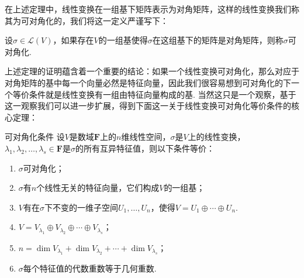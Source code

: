 在上述定理中，线性变换在一组基下矩阵表示为对角矩阵，这样的线性变换我们称其为可对角化的，我们将这一定义严谨写下：
\begin{definition}{}{}
    设$\sigma\in\mathcal{L}(V)$，如果存在$V$的一组基使得$\sigma$在这组基下的矩阵是对角矩阵，则称$\sigma$可对角化.
\end{definition}

上述定理的证明蕴含着一个重要的结论：如果一个线性变换可对角化，那么对应于对角矩阵的基中每一个向量必然是特征向量，因此我们很容易想到可对角化的下一个等价条件就是线性变换有一组由特征向量构成的基. 当然这只是一个观察，基于这一观察我们可以进一步扩展，得到下面这一关于线性变换可对角化等价条件的核心定理：
\begin{theorem}{}{可对角化条件}
    设$V$是数域$\mathbf{F}$上的$n$维线性空间，$\sigma$是$V$上的线性变换，$\lambda_1,\lambda_2,\ldots,\lambda_s\in\mathbf{F}$是$\sigma$的所有互异特征值，则以下条件等价：
    \begin{enumerate}
        \item \label{item:16:可对角化条件:1}
              $\sigma$可对角化；

        \item \label{item:16:可对角化条件:2}
              $\sigma$有$n$个线性无关的特征向量，它们构成$V$的一组基；

        \item \label{item:16:可对角化条件:3}
              $V$有在$\sigma$下不变的一维子空间$U_1,\ldots,U_n$，使得$V=U_1\oplus\cdots\oplus U_n$.

        \item \label{item:16:可对角化条件:4}
              $V=V_{\lambda_1}\oplus V_{\lambda_2}\oplus\cdots\oplus V_{\lambda_s}$；

        \item \label{item:16:可对角化条件:5}
              $n=\dim V_{\lambda_1}+\dim V_{\lambda_2}+\cdots+\dim V_{\lambda_s}$；

        \item \label{item:16:可对角化条件:6}
              $\sigma$每个特征值的代数重数等于几何重数.
    \end{enumerate}
\end{theorem}


